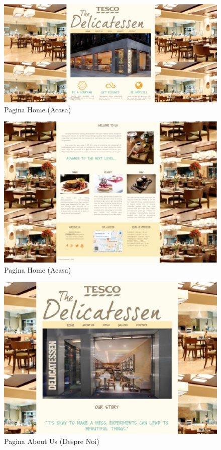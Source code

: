 \documentclass[11pt]{article}
\begin{document}
\begin{figure}[h]
\includegraphics{images/2.eps}
\caption{Pagina Home (Acasa)}
\end{figure}

\begin{figure}[h]
\includegraphics{images/21.eps}
\caption{Pagina Home (Acasa)}
\end{figure}

\begin{figure}[h]
\includegraphics{images/3.eps}
\caption{Pagina About Us (Despre Noi)}
\end{figure}
\end{document}
